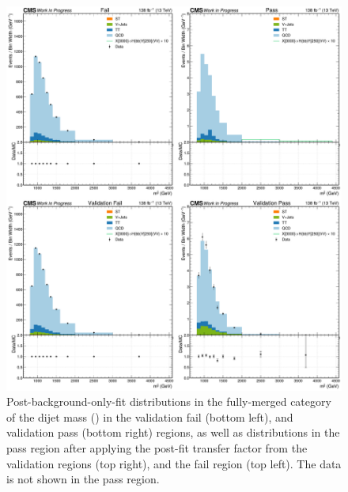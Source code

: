 \begin{figure}[hbt!]
\centering
\includegraphics[width=\textwidth]{figures/05-HH/results_res/postfit_DijetMass.pdf}
\caption[Post-background-only-fit distributions in the fully-merged category of the dijet mass (\mjj).]{Post-background-only-fit distributions in the fully-merged category of the dijet mass (\mjj) in the validation fail (bottom left), and validation pass (bottom right) regions, as well as distributions in the pass region after applying the post-fit transfer factor from the validation regions (top right), and the fail region (top left).
The data is not shown in the pass region.
\label{fig:05_results_xhy_postfit_fm_mjj}
}
\end{figure}

